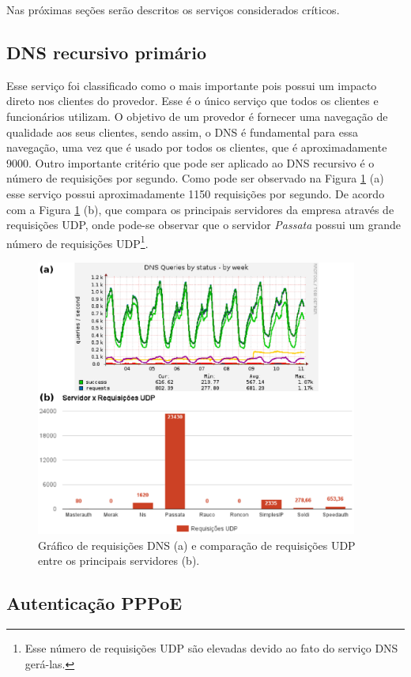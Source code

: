 Nas próximas seções serão descritos os serviços considerados críticos.

\subsection{\ac{DNS} recursivo primário}
\label{section:dnsrecprim}

Esse serviço foi classificado como o mais importante pois possui um impacto direto nos clientes do provedor. Esse é o único serviço que todos 
os clientes e funcionários utilizam. O objetivo de um provedor é fornecer uma navegação de qualidade aos seus clientes, sendo assim, o \ac{DNS} 
é fundamental para essa navegação, uma vez que é usado por todos os clientes, que é aproximadamente 9000. Outro importante critério que pode ser 
aplicado ao \ac{DNS} recursivo é o número de requisições por segundo. Como pode ser observado na Figura \ref{fig:dns_udp} (a) esse serviço
possui aproximadamente 1150 requisições por segundo. De acordo com a Figura \ref{fig:dns_udp} (b), que compara os principais servidores da 
empresa através de requisições \ac{UDP}, onde pode-se observar que o servidor \textit{Passata} possui um grande número de requisições 
\ac{UDP}\footnote[1]{Esse número de requisições \ac{UDP} são elevadas devido ao fato do serviço \ac{DNS} gerá-las.}.

\begin{figure}[h!]
 \centering
 \includegraphics[width=400px]{img/dns_udp.eps}
 \caption{Gráfico de requisições DNS (a) e comparação de requisições UDP entre os principais servidores (b).}
 \label{fig:dns_udp}
\end{figure}

\subsection{Autenticação PPPoE}
\label{section:radius}

